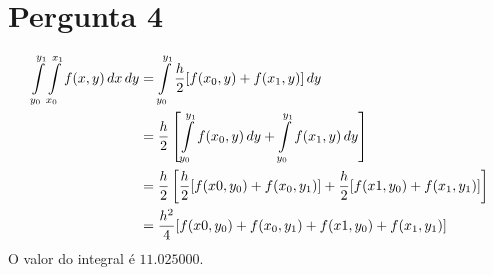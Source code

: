 {\section{Pergunta 4}
\begin{alignat*}{2}
	\int\displaylimits_{y_0}^{y_1}{\int\displaylimits_{x_0}^{x_1}{f(x,y)\,dx}\,dy}
	&= \int\displaylimits_{y_0}^{y_1}{\frac{h}{2}[f(x_0,y)+f(x_1,y)]\,dy}\\
	&= \frac{h}{2}\left[\int\displaylimits_{y_0}^{y_1}{f(x_0,y)\,dy}+\int\displaylimits_{y_0}^{y_1}{f(x_1,y)\,dy}\right]\\
	&= \frac{h}{2}\left[\frac{h}{2}[f(x0,y_0)+f(x_0,y_1)]+\frac{h}{2}[f(x1,y_0)+f(x_1,y_1)]\right]\\
	&= \frac{h^2}{4}[f(x0,y_0)+f(x_0,y_1)+f(x1,y_0)+f(x_1,y_1)]
\end{alignat*}
%
O valor do integral é $11.025000$.

}
